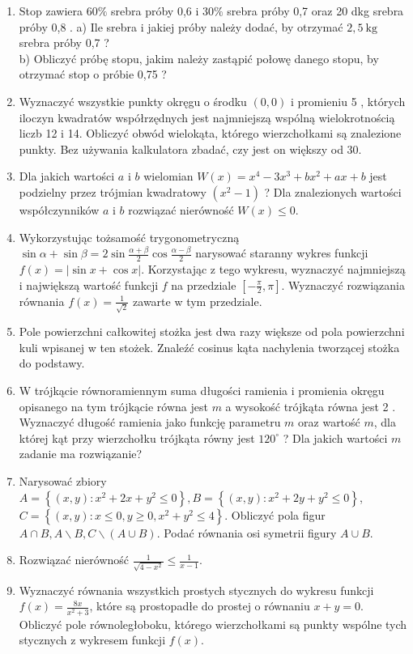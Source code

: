 \documentclass[10pt]{article}
\begin{document}
\begin{enumerate}
  \item Stop zawiera $60 \%$ srebra próby 0,6 i $30 \%$ srebra próby 0,7 oraz 20 dkg srebra próby 0,8 . a) Ile srebra i jakiej próby należy dodać, by otrzymać $2,5 \mathrm{~kg}$ srebra próby 0,7 ?\\
b) Obliczyć próbę stopu, jakim należy zastąpić połowę danego stopu, by otrzymać stop o próbie 0,75 ?
  \item Wyznaczyć wszystkie punkty okręgu o środku $(0,0)$ i promieniu 5 , których iloczyn kwadratów współrzędnych jest najmniejszą wspólną wielokrotnością liczb 12 i 14. Obliczyć obwód wielokąta, którego wierzchołkami są znalezione punkty. Bez używania kalkulatora zbadać, czy jest on większy od 30.
  \item Dla jakich wartości $a$ i $b$ wielomian $W(x)=x^{4}-3 x^{3}+b x^{2}+a x+b$ jest podzielny przez trójmian kwadratowy $\left(x^{2}-1\right)$ ? Dla znalezionych wartości współczynników $a$ i $b$ rozwiązać nierówność $W(x) \leqslant 0$.
  \item Wykorzystując tożsamość trygonometryczną $\sin \alpha+\sin \beta=2 \sin \frac{\alpha+\beta}{2} \cos \frac{\alpha-\beta}{2}$ narysować staranny wykres funkcji $f(x)=|\sin x+\cos x|$. Korzystając z tego wykresu, wyznaczyć najmniejszą i największą wartość funkcji $f$ na przedziale $\left[-\frac{\pi}{2}, \pi\right]$. Wyznaczyć rozwiązania równania $f(x)=\frac{1}{\sqrt{2}}$ zawarte w tym przedziale.
  \item Pole powierzchni całkowitej stożka jest dwa razy większe od pola powierzchni kuli wpisanej w ten stożek. Znaleźć cosinus kąta nachylenia tworzącej stożka do podstawy.
  \item W trójkącie równoramiennym suma długości ramienia i promienia okręgu opisanego na tym trójkącie równa jest $m$ a wysokość trójkąta równa jest 2 . Wyznaczyć długość ramienia jako funkcję parametru $m$ oraz wartość $m$, dla której kąt przy wierzchołku trójkąta równy jest $120^{\circ}$ ? Dla jakich wartości $m$ zadanie ma rozwiązanie?
  \item Narysować zbiory $A=\left\{(x, y): x^{2}+2 x+y^{2} \leqslant 0\right\}, B=\left\{(x, y): x^{2}+2 y+y^{2} \leqslant 0\right\}$, $C=\left\{(x, y): x \leqslant 0, y \geqslant 0, x^{2}+y^{2} \leqslant 4\right\}$. Obliczyć pola figur $A \cap B, A \backslash B, C \backslash(A \cup B)$. Podać równania osi symetrii figury $A \cup B$.
  \item Rozwiązać nierówność $\frac{1}{\sqrt{4-x^{2}}} \leqslant \frac{1}{x-1}$.
  \item Wyznaczyć równania wszystkich prostych stycznych do wykresu funkcji $f(x)=\frac{8 x}{x^{2}+3}$, które są prostopadłe do prostej o równaniu $x+y=0$. Obliczyć pole równoległoboku, którego wierzchołkami są punkty wspólne tych stycznych z wykresem funkcji $f(x)$.
\end{enumerate}
\end{document}
